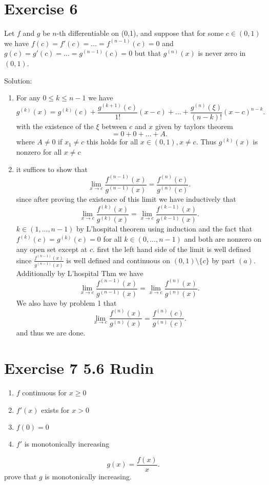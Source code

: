 \documentclass[11pt]{article}
\newcommand{\solution}[1]{{{\textcolor{header}{Solution:} \textcolor{solution}{#1}}}}
\begin{document}
\section{Exercise 6}
Let $f$ and $g$ be $n$-th differentiable on (0,1), and suppose that for some $c \in (0,1)$ we have 
$f(c) = f'(c) = \dots = f^{(n-1)}(c) = 0$ and $g(c) = g'(c) = \dots = g^{(n-1)}(c) = 0$ but that $g^{(n)}(x)$ is never zero in $(0,1)$.
\solution{
    \begin{enumerate}
        \item For any $0 \le k \le n-1$
            we have
             \[
            g^{(k)}(x) = g^{(k)}(c) + \frac{g^{(k+1)}(c)}{1!}(x-c) + \dots + \frac{g^{(n)}(\xi)}{(n-k)!}(x-c)^{n-k}
            .\] 
            with the existence of the $\xi$ between $c$ and $x$ given by taylors theorem
            \[
            = 0 + 0 + \dots + A
            .\] 
            where $A \ne 0$ if  $x_1 \ne c$ this holds for all $x \in (0,1), x \ne c$. Thus  $g^{(k)}(x)$ is nonzero for all $x \ne c$
        \item 
            it suffices to show that
            \[
            \lim_{x\to c} \frac{f^{(n-1)}(x)}{g^{(n-1)}(x)} = \frac{f^{(n)}(c)}{g^{(n)}(c)}
            .\] 
            since after proving the existence of this limit we have inductively that
            \[
            \lim_{x\to c} \frac{f^{(k)}(x)}{g^{(k)}(x)} = \lim_{x\to c} \frac{f^{(k-1)}(x)}{g^{(k-1)}(x)}
            .\] 
            $k \in (1,...,n-1)$ by L'hospital theorem using induction and the fact that  $f^{(k)}(c) = g^{(k)}(c) = 0$ for all $k \in (0,...,n-1)$ and both are nonzero on any open set except at $c$.
            first the left hand side of the limit is well defined since $\frac{f^{(n-1)}(x)}{g^{(n-1)}(x)}$ is well defined and continuous on $(0,1) \setminus \{c\}$ by part  $(a)$.
            Additionally by L'hospital Thm we have
            \[
            \lim_{x\to c}\frac{f^{(n-1)}(x)}{g^{(n-1)}(x)} = \lim_{x\to c}\frac{f^{(n)}(x)}{g^{(n)}(x)}
            .\] 
            We also have by problem 1 that
            \[
            \lim_{x\to c}\frac{f^{(n)}(x)}{g^{(n)}(x)} = \frac{f^{(n)}(c)}{g^{(n)}(c)}
            .\] 
            and thus we are done.
    \end{enumerate}
}

\section{Exercise 7 5.6 Rudin}
\begin{enumerate}
    \item $f$ continuous for $x \ge 0$ 
    \item $f'(x)$ exists for $x > 0$ 
    \item $f(0) = 0$ 
    \item $f'$ is monotonically increasing
\end{enumerate}
\[
g(x) = \frac{f(x)}{x}
.\] 
prove that $g$ is monotonically increasing.
\end{document}
